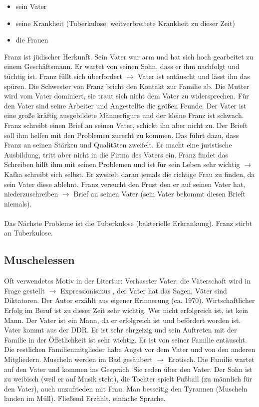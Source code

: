 \documentclass[12pt,a4paper]{article}
\begin{document}
\begin{itemize}
\item sein Vater
\item seine Krankheit (Tuberkulose; weitverbreitete Krankheit zu dieser Zeit)
\item die Frauen
\end{itemize}
Franz ist jüdischer Herkunft. Sein Vater war arm und hat sich hoch gearbeitet zu einem Geschäftsmann. Er wartet von seinen Sohn, dass er ihm nachfolgt und tüchtig ist. Franz füllt sich überfordert $\rightarrow$ Vater ist entäuscht und lässt ihn das spüren. Die Schwester von Franz bricht den Kontakt zur Familie ab. Die Mutter wird vom Vater dominiert, sie traut sich nicht dem Vater zu widersprechen. Für den Vater sind seine Arbeiter und Angestellte die größen Feunde. Der Vater ist eine große kräftig ausgebildete Männerfigure und der kleine Franz ist schwach. Franz schreibt einen Brief an seinen Vater, schickt ihn aber nicht zu. Der Brieft soll ihm helfen mit den Problemen zurecht zu kommen. Das führt dazu, dass Franz an seinen Stärken und Qualitäten zweifelt. Er macht eine juristische Ausbildung, tritt aber nicht in die Firma des Vaters ein. Franz findet das Schreiben hilft ihm mit seinen Problemen und ist für sein Leben sehr wichtig $\rightarrow$ Kafka schreibt sich selbst. Er zweifelt daran jemals die richtige Frau zu finden, da sein Vater diese ablehnt. Franz versucht den Frust den er auf seinen Vater hat, niederzuschreiben $\rightarrow$ Brief an seinen Vater (sein Vater bekommt diesen Brieft niemals).\\\\
Das Nächste Probleme ist die Tuberkulose (bakterielle Erkrankung). Franz stirbt an Tuberkulose.

\subsection{Muschelessen}

Oft verwendetes Motiv in der Litertur: Verhasster Vater; die Väterschaft wird in Frage gestellt $\rightarrow$ Expressionismus , der Vater hat das Sagen, Väter sind Diktatoren. Der Autor erzählt aus eigener Erinnerung (ca. 1970). Wirtschaftlicher Erfolg im Beruf ist zu dieser Zeit sehr wichtig. Wer nicht erfolgreich ist, ist kein Mann. Der Vater ist ein Mann, da er erfolgreich ist und befördert worden ist. Vater kommt aus der DDR. Er ist sehr ehrgeizig und sein Auftreten mit der Familie in der Öffetlichkeit ist sehr wichtig. Er ist von seiner Familie entäuscht. Die restlichen Familienmitglieder habe Angst vor dem Vater und von den anderen Mitgliedern. Muscheln werden im Bad gesäubert $\rightarrow$ Erotisch. Die Familie wartet auf den Vater und kommen ins Gespräch. Sie reden über den Vater. Der Sohn ist zu weibisch (weil er auf Musik steht), die Tochter spielt Fußball (zu männlich für den Vater), auch unzufrieden mit Frau. Man besseitig den Tyrannen (Muscheln landen im Müll). Fließend Erzählt, einfache Sprache.
\end{document}
